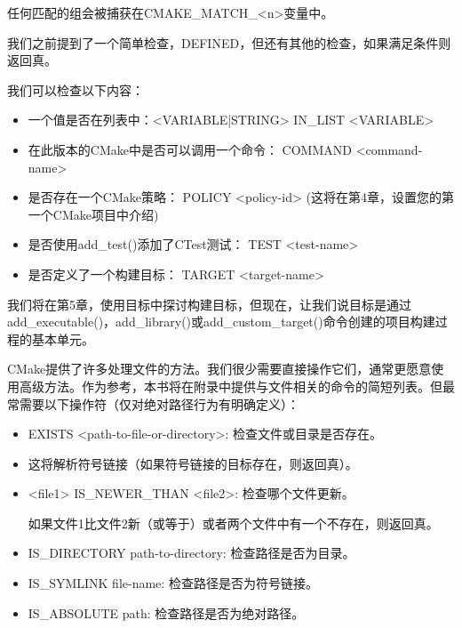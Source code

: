 任何匹配的组会被捕获在CMAKE\_MATCH\_<n>变量中。


我们之前提到了一个简单检查，DEFINED，但还有其他的检查，如果满足条件则返回真。

我们可以检查以下内容：

\begin{itemize}
\item
一个值是否在列表中：<VARIABLE|STRING> IN\_LIST <VARIABLE>

\item
在此版本的CMake中是否可以调用一个命令： COMMAND <command-name>

\item
是否存在一个CMake策略： POLICY <policy-id> (这将在第4章，设置您的第一个CMake项目中介绍)

\item
是否使用add\_test()添加了CTest测试： TEST <test-name>

\item
是否定义了一个构建目标： TARGET <target-name>
\end{itemize}

我们将在第5章，使用目标中探讨构建目标，但现在，让我们说目标是通过add\_executable()，add\_library()或add\_custom\_target()命令创建的项目构建过程的基本单元。


CMake提供了许多处理文件的方法。我们很少需要直接操作它们，通常更愿意使用高级方法。作为参考，本书将在附录中提供与文件相关的命令的简短列表。但最常需要以下操作符（仅对绝对路径行为有明确定义）：

\begin{itemize}
\item
EXISTS <path-to-file-or-directory>: 检查文件或目录是否存在。

\item
 这将解析符号链接（如果符号链接的目标存在，则返回真）。

\item
<file1> IS\_NEWER\_THAN <file2>: 检查哪个文件更新。

如果文件1比文件2新（或等于）或者两个文件中有一个不存在，则返回真。

\item
IS\_DIRECTORY path-to-directory: 检查路径是否为目录。

\item
IS\_SYMLINK file-name: 检查路径是否为符号链接。

\item
IS\_ABSOLUTE path: 检查路径是否为绝对路径。
\end{itemize}


